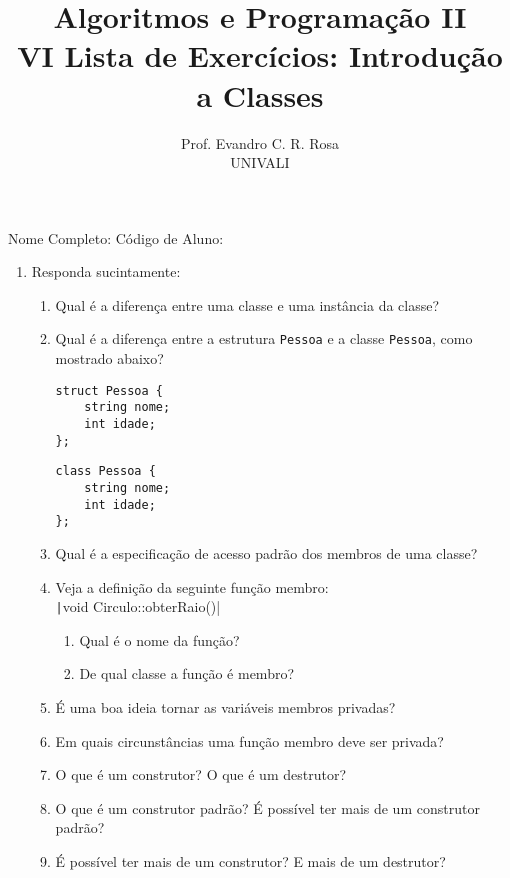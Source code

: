 \documentclass[12pt]{article}
\title{Algoritmos e Programação II\\
\large VI Lista de Exercícios: Introdução a Classes}
\author{Prof. Evandro C. R. Rosa\\UNIVALI}
\date{}
\begin{document}
\maketitle

\noindent Nome Completo: \underline{\hspace{8cm}} Código de Aluno: \underline{\hspace{2.4cm}}

\begin{enumerate}
  \item Responda sucintamente:
    \begin{enumerate}
      \item Qual é a diferença entre uma classe e uma instância da classe?
      \item Qual é a diferença entre a estrutura \texttt{Pessoa} e a classe \texttt{Pessoa}, como mostrado abaixo?
      
        \begin{minipage}{.3\linewidth}
          \begin{verbatim}
struct Pessoa {
    string nome;
    int idade;
};
          \end{verbatim}
        \end{minipage}
        \begin{minipage}{.3\linewidth}
          \begin{verbatim}
class Pessoa {
    string nome;
    int idade;
};
          \end{verbatim}
        \end{minipage}

      \item Qual é a especificação de acesso padrão dos membros de uma classe?
      \item Veja a definição da seguinte função membro:\\ \texttt|void Circulo::obterRaio()|
        \begin{enumerate}
          \item Qual é o nome da função?
          \item De qual classe a função é membro?
        \end{enumerate}
      \item É uma boa ideia tornar as variáveis membros privadas?
      \item Em quais circunstâncias uma função membro deve ser privada?
      \item O que é um construtor? O que é um destrutor?
      \item O que é um construtor padrão? É possível ter mais de um construtor padrão?
      \item É possível ter mais de um construtor? E mais de um destrutor?
    \end{enumerate}


\end{enumerate}
\end{document}
